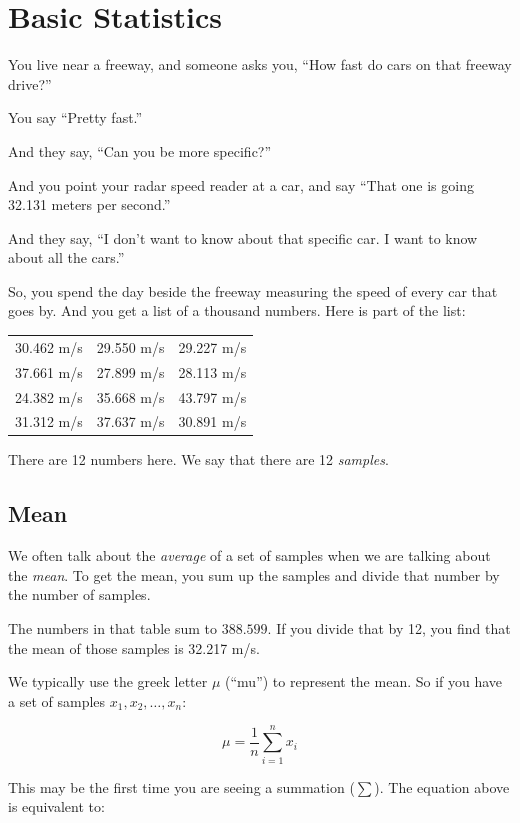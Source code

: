 \chapter{Basic Statistics}

You live near a freeway, and someone asks you, ``How fast do cars on that freeway drive?''

You say ``Pretty fast.''

And they say, ``Can you be more specific?''

And you point your radar speed reader at a car, and say ``That one is going 32.131 meters per second.''

And they say, ``I don't want to know about that specific car. I want to know about all the cars.''

So, you spend the day beside the freeway measuring the speed of every
car that goes by.  And you get a list of a thousand numbers. Here is part of the
list:

\begin{tabular}{c | c | c}
30.462 m/s  & 29.550 m/s & 29.227 m/s \\
37.661 m/s  & 27.899 m/s & 28.113 m/s \\
24.382 m/s & 35.668 m/s & 43.797 m/s \\
31.312 m/s & 37.637 m/s & 30.891 m/s
\end {tabular}

There are 12 numbers here.  We say that there are 12 \textit{samples}.

\section{Mean}

We often talk about the \textit{average} of a set of samples when we
are talking about the \textit{mean}.  To get the mean, you sum up the
samples and divide that number by the number of samples.

The numbers in that table sum to $388.599$.  If you divide that by 12,
you find that the mean of those samples is 32.217 m/s.

We typically use the greek letter $\mu$ (``mu'') to represent the mean. So if you have a set of samples $x_1, x_2, \ldots, x_n$:

$$ \mu = \frac{1}{n} \sum_{i=1}^n x_i$$

This may be the first time you are seeing a summation ($\sum$).  The equation above is equivalent to:

